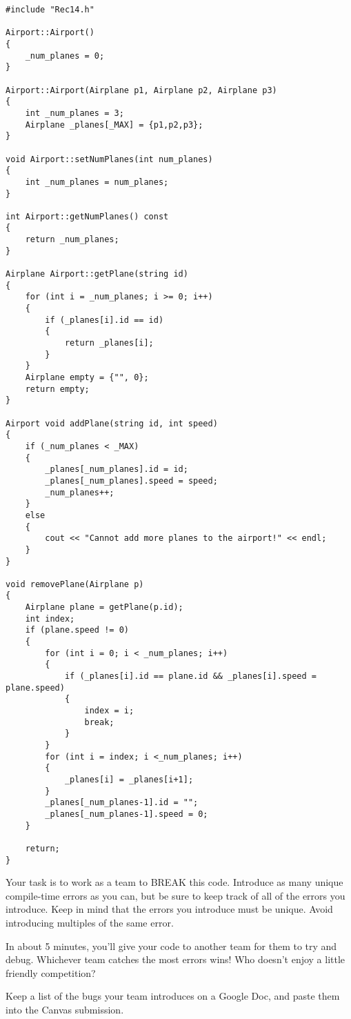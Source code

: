 \begin{verbatim}
#include "Rec14.h"

Airport::Airport()
{
    _num_planes = 0;
}

Airport::Airport(Airplane p1, Airplane p2, Airplane p3)
{
    int _num_planes = 3;
	Airplane _planes[_MAX] = {p1,p2,p3};
}

void Airport::setNumPlanes(int num_planes)
{
    int _num_planes = num_planes; 
}

int Airport::getNumPlanes() const
{
    return _num_planes;
}

Airplane Airport::getPlane(string id)
{
    for (int i = _num_planes; i >= 0; i++) 
    {
        if (_planes[i].id == id)
        {
            return _planes[i];
        }
    }
    Airplane empty = {"", 0};
    return empty;
}

Airport void addPlane(string id, int speed)
{
    if (_num_planes < _MAX)
    {
        _planes[_num_planes].id = id;
        _planes[_num_planes].speed = speed;
        _num_planes++;
    }
    else
    {
        cout << "Cannot add more planes to the airport!" << endl;
    }
}

void removePlane(Airplane p)
{
    Airplane plane = getPlane(p.id);
    int index;
    if (plane.speed != 0)
    {
        for (int i = 0; i < _num_planes; i++) 
        {
            if (_planes[i].id == plane.id && _planes[i].speed = plane.speed)
            {
                index = i;
                break;
            }
        }
        for (int i = index; i <_num_planes; i++) 
        {
            _planes[i] = _planes[i+1];
        }
        _planes[_num_planes-1].id = "";
        _planes[_num_planes-1].speed = 0;
    }
    
    return;
}
\end{verbatim}

\begin{multipart}
Your task is to work as a team to BREAK this code. Introduce as many unique compile-time errors as you can, but be sure to keep track of all of the errors you introduce. Keep in mind that the errors you introduce must be unique. Avoid introducing multiples of the same error.

In about 5 minutes, you’ll give your code to another team for them to try and debug. Whichever team catches the most errors wins! Who doesn’t enjoy a little friendly competition?

Keep a list of the bugs your team introduces on a Google Doc, and paste them into the Canvas submission.
\end{multipart}

